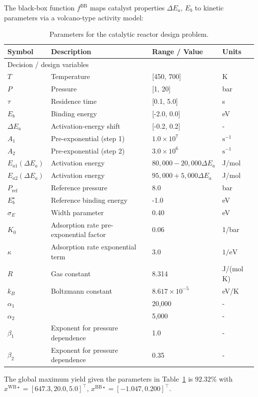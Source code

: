\documentclass[12pt,a4paper]{article}%
\theoremstyle{plain}%
\theoremstyle{remark}%
\theoremstyle{definition}%
\def\WB{\mathrm{WB}}
\def\BB{\mathrm{BB}}
\begin{document}
\begin{appendices}
The black-box function $f^{\BB}$ maps catalyst properties $\Delta E_a$, $E_b$ to kinetic parameters via a volcano-type activity model:



\begin{table}[htbp]
    \caption{Parameters for the catalytic reactor design problem.\label{tab:cstr_parameters}}
\begin{tabular}{llll}
    \toprule
    \bf{Symbol} & \bf{Description} & \bf{Range / Value} & \bf{Units} \\
    \midrule
    \multicolumn{4}{l}{Decision / design variables} \\
    \midrule
    $T$ & Temperature & [450, 700] & K \\
    $P$ & Pressure & [1, 20] & bar \\
    $\tau$ & Residence time & [0.1, 5.0] & s \\
    $E_b$ & Binding energy & [-2.0, 0.0] & eV \\
    $\Delta E_a$ & Activation-energy shift & [-0.2, 0.2] & - \\
    \midrule
    $A_1$ & Pre-exponential (step 1) & $1.0 \times 10^7$ & $\mathrm{s}^{-1}$ \\
    $A_2$ & Pre-exponential (step 2) & $3.0 \times 10^6$ & $\mathrm{s}^{-1}$ \\
    $E_{a 1}\left(\Delta E_a\right)$ & Activation energy & $80,000-20,000 \Delta E_a$ & J/mol \\
    $E_{a 2}\left(\Delta E_a\right)$ & Activation energy & $95,000+5,000 \Delta E_a$ & J/mol \\
    $P_{\text {ref }}$ & Reference pressure & 8.0 & bar \\
    $E_b^{\star}$ & Reference binding energy & -1.0 & eV \\
    $\sigma_E$ & Width parameter & 0.40 & eV \\
    $K_0$ & Adsorption rate pre-exponential factor & 0.06 & 1/bar \\
    $\kappa$ & Adsorption rate exponential term & 3.0 & $1 / \mathrm{eV}$ \\
    $R$ & Gas constant & 8.314 & J/(mol K) \\
    $k_B$ & Boltzmann constant & $8.617 \times 10^{-5}$ & eV/K \\
    $\alpha_1$ & & 20,000 & - \\
    $\alpha_2$ & & 5,000 & - \\
    $\beta_1$ & Exponent for pressure dependence & 1.0 & - \\
    $\beta_2$ & Exponent for pressure dependence & 0.35 & - \\
    \bottomrule
\end{tabular}
\end{table}
The global maximum yield given the parameters in Table~\ref{tab:cstr_parameters} is $92.32\%$ with $x^{\WB\star} = [647.3, 20.0, 5.0]^\top$, $x^{\BB\star} = [-1.047, 0.200]^\top$.


\end{appendices}
\end{document}
